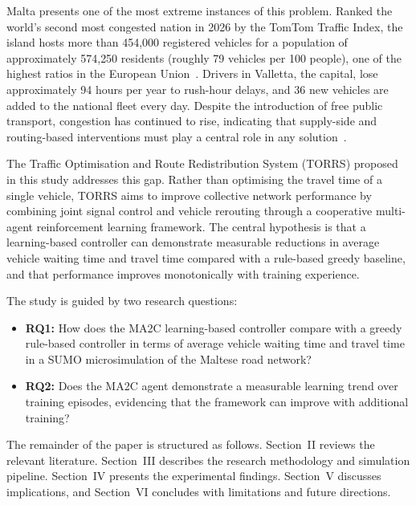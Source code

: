 \documentclass[conference]{IEEEtran}
\begin{document}
Malta presents one of the most extreme instances of this problem. Ranked the
world's second most congested nation in 2026 by the TomTom Traffic Index, the
island hosts more than 454{,}000 registered vehicles for a population of
approximately 574{,}250 residents (roughly 79 vehicles per 100 people), one of
the highest ratios in the European Union~\cite{tomtom2026,nso2024}. Drivers in
Valletta, the capital, lose approximately 94 hours per year to rush-hour delays,
and 36 new vehicles are added to the national fleet every day. Despite the
introduction of free public transport, congestion has continued to rise, indicating
that supply-side and routing-based interventions must play a central role in any
solution~\cite{nso2024}.

The Traffic Optimisation and Route Redistribution System (TORRS) proposed in
this study addresses this gap. Rather than optimising the travel time of a single
vehicle, TORRS aims to improve collective network performance by combining joint
signal control and vehicle rerouting through a cooperative multi-agent
reinforcement learning framework. The central hypothesis is that a learning-based
controller can demonstrate measurable reductions in average vehicle waiting time
and travel time compared with a rule-based greedy baseline, and that performance
improves monotonically with training experience.

The study is guided by two research questions:

\begin{itemize}
    \item \textbf{RQ1:} How does the MA2C learning-based controller compare with
    a greedy rule-based controller in terms of average vehicle waiting time and
    travel time in a SUMO microsimulation of the Maltese road network?
    \item \textbf{RQ2:} Does the MA2C agent demonstrate a measurable learning
    trend over training episodes, evidencing that the framework can improve with
    additional training?
\end{itemize}

The remainder of the paper is structured as follows. Section~II reviews the
relevant literature. Section~III describes the research methodology and
simulation pipeline. Section~IV presents the experimental findings. Section~V
discusses implications, and Section~VI concludes with limitations and future
directions.

\end{document}
